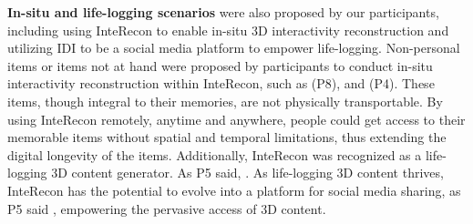 \textbf{In-situ and life-logging scenarios} were also proposed by our participants, including using InteRecon to enable in-situ 3D interactivity reconstruction and utilizing IDI to be a social media platform to empower life-logging.
Non-personal items or items not at hand were proposed by participants to conduct in-situ interactivity reconstruction within InteRecon, such as  (P8),  and  (P4).
These items, though integral to their memories, are not physically transportable.
By using InteRecon remotely, anytime and anywhere, people could get access to their memorable items without spatial and temporal limitations, thus extending the digital longevity of the items.
Additionally, InteRecon was recognized as a life-logging 3D content generator. 
As P5 said, .
As life-logging 3D content thrives, InteRecon has the potential to evolve into a platform for social media sharing, as P5 said , empowering the pervasive access of 3D content.





